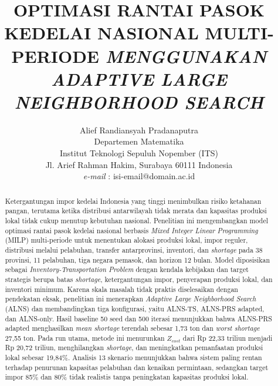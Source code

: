 \documentclass[journal]{IEEEtran}
\theoremstyle{definition}
\theoremstyle{definition}
\theoremstyle{plain}
\begin{document}
    \title{OPTIMASI RANTAI PASOK KEDELAI NASIONAL MULTI-PERIODE \textit{MENGGUNAKAN ADAPTIVE LARGE NEIGHBORHOOD SEARCH}\\ \vspace{12pt}}

    \author{Alief Randiansyah Pradanaputra\\
    Departemen Matematika\\Institut Teknologi Sepuluh Nopember (ITS)\\
    Jl. Arief Rahman Hakim, Surabaya 60111 Indonesia\\
    \textit{e-mail} : isi-email@domain.ac.id\\ \vspace{-1em}}

     \maketitle

    \begin{abstract}
   \small \noindent Ketergantungan impor kedelai Indonesia yang tinggi menimbulkan risiko ketahanan pangan, terutama ketika distribusi antarwilayah tidak merata dan kapasitas produksi lokal tidak cukup menutup kebutuhan nasional. Penelitian ini mengembangkan model optimasi rantai pasok kedelai nasional berbasis \textit{Mixed Integer Linear Programming} (MILP) multi-periode untuk menentukan alokasi produksi lokal, impor reguler, distribusi melalui pelabuhan, transfer antarprovinsi, inventori, dan \textit{shortage} pada 38 provinsi, 11 pelabuhan, tiga negara pemasok, dan horizon 12 bulan. Model diposisikan sebagai \textit{Inventory-Transportation Problem} dengan kendala kebijakan dan target strategis berupa batas \textit{shortage}, ketergantungan impor, penyerapan produksi lokal, dan inventori minimum. Karena skala masalah tidak praktis diselesaikan dengan pendekatan eksak, penelitian ini menerapkan \textit{Adaptive Large Neighborhood Search} (ALNS) dan membandingkan tiga konfigurasi, yaitu ALNS-TS, ALNS-PRS adapted, dan ALNS-only. Hasil baseline 50 seed dan 500 iterasi menunjukkan bahwa ALNS-PRS adapted menghasilkan \textit{mean shortage} terendah sebesar 1,73 ton dan \textit{worst shortage} 27,55 ton. Pada run utama, metode ini menurunkan $Z_{cost}$ dari Rp 22,33 triliun menjadi Rp 20,72 triliun, menghilangkan \textit{shortage}, dan meningkatkan pemanfaatan produksi lokal sebesar 19,84\%. Analisis 13 skenario menunjukkan bahwa sistem paling rentan terhadap penurunan kapasitas pelabuhan dan kenaikan permintaan, sedangkan target impor 85\% dan 80\% tidak realistis tanpa peningkatan kapasitas produksi lokal.
    \end{abstract}
\end{document}
